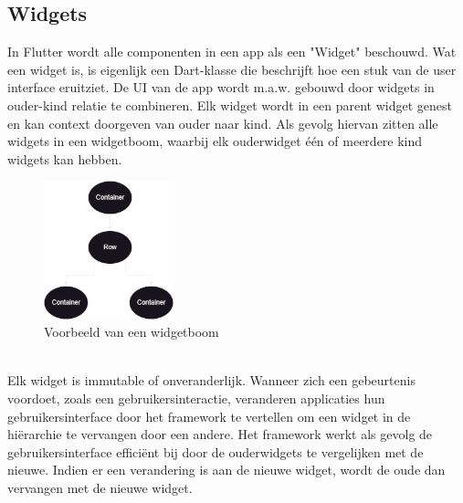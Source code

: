 \subsection[widget]{Widgets}
\label{sec:Widgets}
In Flutter wordt alle componenten in een app als een "Widget" beschouwd. Wat een widget is, is eigenlijk een Dart-klasse die beschrijft hoe een stuk van de user interface eruitziet.
De UI van de app wordt m.a.w. gebouwd door widgets in ouder-kind relatie te combineren. Elk widget wordt in een parent widget genest en kan context doorgeven van ouder naar kind.
Als gevolg hiervan zitten alle widgets in een widgetboom, waarbij elk ouderwidget één of meerdere kind widgets kan hebben.
\\
\begin{figure}[h]
    \centering
    \includegraphics[height=4cm, keepaspectratio]{graphics/widgetTree.png}
    \caption{Voorbeeld van een widgetboom}
\end{figure}
\\
Elk widget is immutable of onveranderlijk. Wanneer zich een gebeurtenis voordoet, zoals een gebruikersinteractie, veranderen applicaties hun gebruikersinterface door het framework te vertellen om een widget in de hiërarchie te vervangen door een andere. 
Het framework werkt als gevolg de gebruikersinterface efficiënt bij door de ouderwidgets te vergelijken met de nieuwe. Indien er een verandering is aan de nieuwe widget, wordt de oude dan vervangen met de nieuwe widget.

